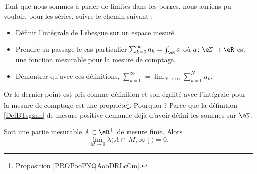 \begin{normaltext}
    Tant que nous sommes à parler de limites dans les bornes, nous aurions pu vouloir, pour les séries, suivre le chemin suivant :
    \begin{itemize}
        \item Définir l'intégrale de Lebesgue sur un espace mesuré.
        \item Prendre au passage le cas particulier \( \sum_{k=0}^{\infty}a_k=\int_\eN a\) où \( a\colon \eN\to \eR\) est une fonction mesurable pour la mesure de comptage.
        \item Démontrer qu'avec ces définitions, \( \sum_{k=0}^{\infty}=\lim_{N\to \infty} \sum_{k=0}^Na_k\).
    \end{itemize}
    Or le dernier point est pris comme définition et son égalité avec l'intégrale pour la mesure de comptage est une propriété\footnote{Proposition \ref{PROPooPNQAooDRLcCm}.}. Pourquoi ? Parce que la définition \ref{DefBTsgznn} de mesure positive demande déjà d'avoir défini les sommes sur \( \eN\).
\end{normaltext}

\begin{lemma}
    Soit une partie mesurable \( A\subset \eR^+\) de mesure finie. Alors
    \begin{equation}
        \lim_{M\to 0} \lambda\big( A\cap\mathopen[ M , \infty \mathclose[ \big)=0.
    \end{equation}
\end{lemma}


